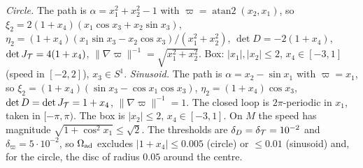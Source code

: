 \emph{Circle.} The path is $\alpha=x_1^2+x_2^2-1$ with $\varpi=\operatorname{atan2}(x_2,x_1)$, so $\xi_2=2(1+x_4)(x_1\cos x_3+x_2\sin x_3)$, $\eta_2=(1+x_4)(x_1\sin x_3-x_2\cos x_3)/(x_1^2+x_2^2)$, $\det D=-2(1+x_4)$, $\det J_\mathcal T=4(1+x_4)$, $\|\nabla\varpi\|^{-1}=\sqrt{x_1^2+x_2^2}$. Box: $|x_1|,|x_2|\le2$, $x_4\in[-3,1]$ (speed in $[-2,2]$), $x_3\in S^1$. \emph{Sinusoid.} The path is $\alpha=x_2-\sin x_1$ with $\varpi=x_1$, so $\xi_2=(1+x_4)(\sin x_3-\cos x_1\cos x_3)$, $\eta_2=(1+x_4)\cos x_3$, $\det D=\det J_\mathcal T=1+x_4$, $\|\nabla\varpi\|^{-1}=1$. The closed loop is $2\pi$-periodic in $x_1$, taken in $[-\pi,\pi)$. The box is $|x_2|\le2$, $x_4\in[-3,1]$. On $M$ the speed has magnitude $\sqrt{1+\cos^2x_1}\le\sqrt2$. The thresholds are $\delta_D=\delta_\mathcal T=10^{-2}$ and $\delta_\varpi=5\cdot10^{-2}$, so $\Omega_{\mathrm{ad}}$ excludes $|1+x_4|\le0.005$ (circle) or $\le0.01$ (sinusoid) and, for the circle, the disc of radius $0.05$ around the centre.

